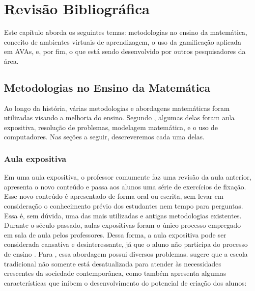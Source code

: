 \chapter{Revisão Bibliográfica}
\label{cap:fundamentacao-teorica}

Este capítulo aborda os seguintes temas: metodologias no ensino da matemática, conceito de ambientes virtuais de aprendizagem, o uso da gamificação aplicada em AVAs, e, por fim, o que está sendo 
desenvolvido por outros pesquisadores da área.

\section{Metodologias no Ensino da Matemática}

Ao longo da história, várias metodologias e abordagens matemáticas foram utilizadas visando a melhoria do ensino. Segundo , algumas delas foram aula expositiva, 
resolução de problemas, modelagem matemática, e o uso de computadores. Nas seções a seguir, descreveremos cada uma delas.

\subsection{Aula expositiva}

Em uma aula expositiva, o professor comumente faz uma revisão da aula anterior, apresenta o novo conteúdo e passa aos alunos uma série de exercícios de fixação. Esse novo conteúdo é apresentado de 
forma oral ou escrita, sem levar em consideração o conhecimento prévio dos estudantes nem tempo para perguntas. Essa é, sem dúvida, uma das mais utilizadas e antigas metodologias existentes. Durante 
o século passado, aulas expositivas foram o único processo empregado em sala de aula pelos professores. Dessa forma, a aula expositiva pode ser considerada cansativa e desinteressante, já que o aluno não participa do processo de ensino  \cite{hammes2003tendencias}. Para , essa abordagem possui diversos problemas.  sugere que a escola tradicional não somente está desatualizada para atender às necessidades 
crescentes da sociedade contemporânea, como também apresenta algumas características que inibem o desenvolvimento do potencial de criação dos alunos:

